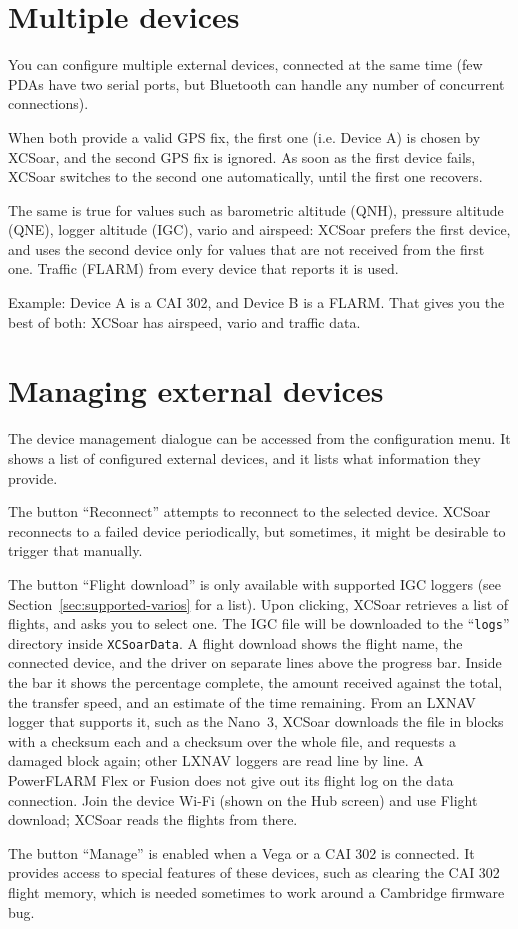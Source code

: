 \section{Multiple devices}

You can configure multiple external devices, connected at the same
time (few PDAs have two serial ports, but Bluetooth can handle any
number of concurrent connections).

When both provide a valid GPS fix, the first one (i.e. Device A) is chosen by
XCSoar, and the second GPS fix is ignored.  As soon as the first device fails,
XCSoar switches to the second one automatically, until the first one recovers.

The same is true for values such as barometric altitude (QNH),
pressure altitude (QNE), logger altitude (IGC), vario and
airspeed: XCSoar prefers the first device, and uses the second
device only for values that are not received from the first one.
Traffic (FLARM) from every device that reports it is used.

Example: Device A is a CAI 302, and Device B is a FLARM.
That gives you the best of both: XCSoar has airspeed, vario and
traffic data.


\section{Managing external devices}

The device management dialogue can be accessed from the configuration
menu. It shows a list of configured external devices,
and it lists what information they provide.

The button ``Reconnect'' attempts to reconnect to the selected
device.  XCSoar reconnects to a failed device periodically, but
sometimes, it might be desirable to trigger that manually.

The button ``Flight download'' is only available with supported IGC
loggers (see Section~\ref{sec:supported-varios} for a list).  Upon clicking,
XCSoar retrieves a list of flights, and asks you to select one.  The
IGC file will be downloaded to the ``\texttt{logs}'' directory inside
\texttt{XCSoarData}.  A flight download shows the flight name, the connected device, and the
driver on separate lines above the progress bar.  Inside the bar it
shows the percentage complete, the amount received against the total,
the transfer speed, and an estimate of the time remaining.
From an LXNAV logger that supports it, such as the Nano~3, XCSoar
downloads the file in blocks with a checksum each and a checksum over
the whole file, and requests a damaged block again; other LXNAV
loggers are read line by line.
A PowerFLARM Flex or Fusion does not give out its flight log on the
data connection.  Join the device Wi-Fi (shown on the Hub screen) and
use Flight download; XCSoar reads the flights from there.

The button ``Manage'' is enabled when a Vega or a CAI 302 is
connected.  It provides access to special features of these devices,
such as clearing the CAI 302 flight memory, which is needed sometimes
to work around a Cambridge firmware bug.
